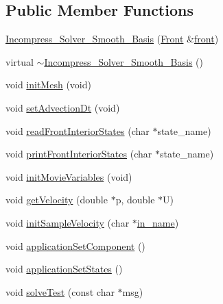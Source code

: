 \subsection*{Public Member Functions}
\begin{DoxyCompactItemize}
\item 
\hyperlink{class_incompress___solver___smooth___basis_a5ad1a4d55273b8d06b4509dd729f5b0f}{Incompress\+\_\+\+Solver\+\_\+\+Smooth\+\_\+\+Basis} (\hyperlink{fdecs_8h_ac32202b798f848095c489cfd04c4ca5f}{Front} \&\hyperlink{class_incompress___solver___smooth___basis_ab792d371ca86ec9ed21b4c95d1375a0b}{front})
\item 
virtual \hyperlink{class_incompress___solver___smooth___basis_ad4ecce000d19dda60fc004490268b376}{$\sim$\+Incompress\+\_\+\+Solver\+\_\+\+Smooth\+\_\+\+Basis} ()
\item 
void \hyperlink{class_incompress___solver___smooth___basis_aa162a2636c3cc1fe6df9659a0d31ae93}{init\+Mesh} (void)
\item 
void \hyperlink{class_incompress___solver___smooth___basis_a81599438a07e2c26421733ad068ca5d4}{set\+Advection\+Dt} (void)
\item 
void \hyperlink{class_incompress___solver___smooth___basis_ae9562ca2b06ab97f444177ee0bbee9ef}{read\+Front\+Interior\+States} (char $\ast$state\+\_\+name)
\item 
void \hyperlink{class_incompress___solver___smooth___basis_a6420056e127746c8b93961c5ffe29029}{print\+Front\+Interior\+States} (char $\ast$state\+\_\+name)
\item 
void \hyperlink{class_incompress___solver___smooth___basis_a8e291964a201d9a7b2fdb99241091475}{init\+Movie\+Variables} (void)
\item 
void \hyperlink{class_incompress___solver___smooth___basis_a9c95810028cadb975424b5f0ce2d45c2}{get\+Velocity} (double $\ast$p, double $\ast$U)
\item 
void \hyperlink{class_incompress___solver___smooth___basis_a21691206778cebb29ecd2c3eb887b4ec}{init\+Sample\+Velocity} (char $\ast$\hyperlink{testfront_8c_aade3fd761de40ee7c68bcad6339774cc}{in\+\_\+name})
\item 
void \hyperlink{class_incompress___solver___smooth___basis_ad9fc0fca22f63d99376a70ed78154132}{application\+Set\+Component} ()
\item 
void \hyperlink{class_incompress___solver___smooth___basis_aa1fe5d785f922fa711ca635aa98e10b0}{application\+Set\+States} ()
\item 
void \hyperlink{class_incompress___solver___smooth___basis_ad0e83204e58fc2952c196578a8d26d06}{solve\+Test} (const char $\ast$msg)

\end{DoxyCompactItemize}
